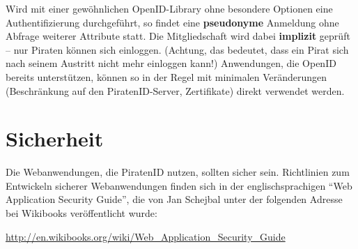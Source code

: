 Wird mit einer gewöhnlichen OpenID-Library ohne besondere Optionen eine Authentifizierung durchgeführt,
so findet eine \textbf{pseudonyme} Anmeldung ohne Abfrage weiterer Attribute statt.
Die Mitgliedschaft wird dabei \textbf{implizit} geprüft -- nur Piraten können sich einloggen.
(Achtung, das bedeutet, dass ein Pirat sich nach seinem Austritt nicht mehr einloggen kann!)
Anwendungen, die OpenID bereits unterstützen, können so in der Regel mit minimalen Veränderungen (Beschränkung auf den PiratenID-Server, Zertifikate) direkt verwendet werden.


\newpage
\section{Sicherheit}

Die Webanwendungen, die PiratenID nutzen, sollten sicher sein.
Richtlinien zum Entwickeln sicherer Webanwendungen finden sich in der englischsprachigen "`Web Application Security Guide"',
die von Jan Schejbal unter der folgenden Adresse bei Wikibooks veröffentlicht wurde:

\url{http://en.wikibooks.org/wiki/Web_Application_Security_Guide}

